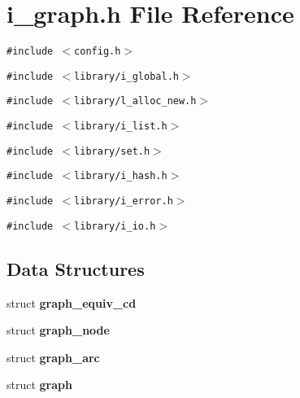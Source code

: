 \section{i\_\-graph.h File Reference}
\label{i__graph_8h}
{\tt \#include $<$config.h$>$}\par
{\tt \#include $<$library/i\_\-global.h$>$}\par
{\tt \#include $<$library/l\_\-alloc\_\-new.h$>$}\par
{\tt \#include $<$library/i\_\-list.h$>$}\par
{\tt \#include $<$library/set.h$>$}\par
{\tt \#include $<$library/i\_\-hash.h$>$}\par
{\tt \#include $<$library/i\_\-error.h$>$}\par
{\tt \#include $<$library/i\_\-io.h$>$}\par
\subsection*{Data Structures}
\begin{CompactItemize}
\item 
struct \bf{graph\_\-equiv\_\-cd}
\item 
struct \bf{graph\_\-node}
\item 
struct \bf{graph\_\-arc}
\item 
struct \bf{graph}
\end{CompactItemize}
